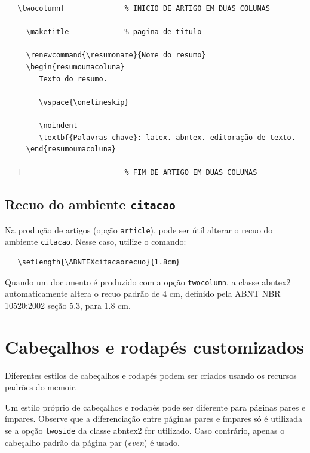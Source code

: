 \documentclass[
	article,			%
	11pt,				%
	oneside,			%
	a4paper,			%
	english,			%
	brazil,				%
	sumario=tradicional
	]{abntex2}
\begin{document}
\begin{verbatim}
   \twocolumn[              % INICIO DE ARTIGO EM DUAS COLUNAS

     \maketitle             % pagina de titulo

     \renewcommand{\resumoname}{Nome do resumo}
     \begin{resumoumacoluna}
        Texto do resumo.
      
        \vspace{\onelineskip}
 
        \noindent
        \textbf{Palavras-chave}: latex. abntex. editoração de texto.
     \end{resumoumacoluna}
   
   ]                        % FIM DE ARTIGO EM DUAS COLUNAS
\end{verbatim}

\subsection{Recuo do ambiente \texttt{citacao}}

Na produção de artigos (opção \texttt{article}), pode ser útil alterar o recuo
do ambiente \texttt{citacao}. Nesse caso, utilize o comando:

\begin{verbatim}
   \setlength{\ABNTEXcitacaorecuo}{1.8cm}
\end{verbatim}

Quando um documento é produzido com a opção \texttt{twocolumn}, a classe
\textsf{abntex2} automaticamente altera o recuo padrão de 4 cm, definido pela
ABNT NBR 10520:2002 seção 5.3, para 1.8 cm.

\section{Cabeçalhos e rodapés customizados}

Diferentes estilos de cabeçalhos e rodapés podem ser criados usando os
recursos padrões do \textsf{memoir}.

Um estilo próprio de cabeçalhos e rodapés pode ser diferente para páginas pares
e ímpares. Observe que a diferenciação entre páginas pares e ímpares só é
utilizada se a opção \texttt{twoside} da classe \textsf{abntex2} for utilizado.
Caso contrário, apenas o cabeçalho padrão da página par (\emph{even}) é usado.
\end{document}

